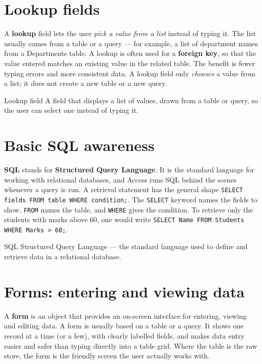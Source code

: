 \section{Lookup fields}
A \textbf{lookup} field lets the user \emph{pick a value from a list} instead
of typing it. The list usually comes from a table or a query --- for example,
a list of department names from a Departments table. A lookup is often used
for a \textbf{foreign key}, so that the value entered matches an existing
value in the related table. The benefit is fewer typing errors and more
consistent data. A lookup field only \emph{chooses} a value from a list; it
does not create a new table or a new query.

\begin{definitionbox}{Lookup field}
A field that displays a list of values, drawn from a table or query, so the
user can select one instead of typing it.
\end{definitionbox}

\section{Basic SQL awareness}
\textbf{SQL} stands for \textbf{Structured Query Language}. It is the
standard language for working with relational databases, and Access runs SQL
behind the scenes whenever a query is run. A retrieval statement has the
general shape \texttt{SELECT fields FROM table WHERE condition;}. The
\texttt{SELECT} keyword names the fields to show, \texttt{FROM} names the
table, and \texttt{WHERE} gives the condition. To retrieve only the students
with marks above 60, one would write
\texttt{SELECT Name FROM Students WHERE Marks > 60;}.

\begin{definitionbox}{SQL}
Structured Query Language --- the standard language used to define and
retrieve data in a relational database.
\end{definitionbox}

\section{Forms: entering and viewing data}
A \textbf{form} is an object that provides an on-screen interface for
entering, viewing and editing data. A form is usually based on a table or a
query. It shows one record at a time (or a few), with clearly labelled
fields, and makes data entry easier and safer than typing directly into a
table grid. Where the table is the raw store, the form is the friendly
screen the user actually works with.

